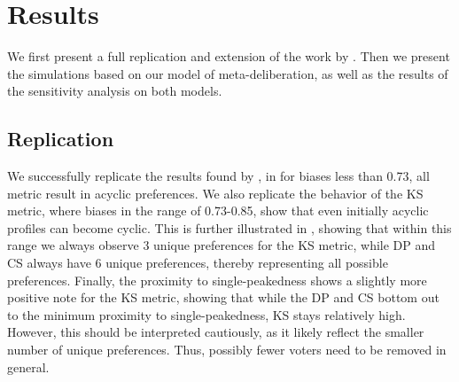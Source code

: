 \documentclass[11pt, oneside, dvipsnames]{Thesis} %
\title{\ttitle} %
\begin{document}
\newpage
\chapter{Results}
\label{experiment_results}
We first present a full replication and extension of the work by
\citet{radDeliberationSinglePeakednessCoherent2021}. Then we present the simulations based on our model of
meta-deliberation, as well as the results of the sensitivity analysis on both
models.


\section{Replication}\label{sec: replication}

We successfully replicate the
results found by \citet{radDeliberationSinglePeakednessCoherent2021},  in
 for biases less than 0.73, all metric result in acyclic
preferences. We also replicate the behavior of the KS metric, where biases in
the range of 0.73-0.85, show that even initially acyclic profiles can become
cyclic. This is further illustrated in , showing that
within this range we always observe 3 unique preferences for the KS metric,
while DP and CS always have 6 unique preferences, thereby representing all
possible preferences. Finally, the proximity to single-peakedness shows a
slightly more positive note for the KS metric, showing that while the DP and CS
bottom out to the minimum proximity to single-peakedness, KS stays relatively
high. However, this should be interpreted cautiously, as it likely reflect the
smaller number of unique preferences. Thus, possibly fewer voters need to be removed in general.
\end{document}

